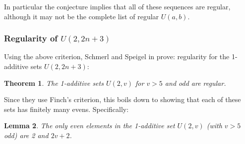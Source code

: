 \documentclass{article}
\newtheorem{theorem}{Theorem}[section]
\newtheorem{lemma}[theorem]{Lemma}
\theoremstyle{definition}
\theoremstyle{remark}
\numberwithin{equation}{section}
\begin{document}
In particular the conjecture implies that all of these sequences are
regular, although it may not be the complete list of regular $U(a,b)$.

\subsubsection{Regularity of $U(2,2n+3)$}

Using the above criterion, Schmerl and Speigel in
\cite{regularity_schmerl} prove: regularity for the 1-additive sets
$U(2, 2n+3)$:

\begin{theorem}
The 1-additive sets $U(2,v)$ for $v > 5$ and odd are regular.
\end{theorem}

Since they use Finch's criterion, this boils down to showing that each
of these sets has finitely many evens.  Specifically: 

\begin{lemma}The only even elements in the 1-additive set $U(2,v)$
  (with $v > 5$ odd) are 2 and $2v+2$.
\end{lemma}
\end{document}
